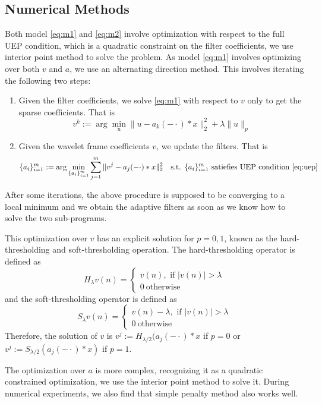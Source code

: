 \documentclass[a4paper]{article}
\begin{document}
\subsection{Numerical Methods}
Both model \eqref{eq:m1} and \eqref{eq:m2} involve optimization with respect to the full UEP condition, which is a quadratic constraint on the filter coefficients, we use interior point method to solve the problem. As model \eqref{eq:m1} involves optimizing over both $v$ and $a$, we use an alternating direction method. This involves iterating the following two steps:
\begin{enumerate}
	\item Given the filter coefficients, we solve \eqref{eq:m1} with respect to $v$ only to get the sparse coefficients. That is 
		\[
			v^{k} := \arg\min_u \|u-a_k(-\cdot)*x\|_2^2 + \lambda \|u\|_p
		\]
	\item Given the wavelet frame coefficients $v$, we update the filters. That is 
	\[
		\{a_i\}_{i=1}^m :=\arg\min_{\{a_i\}_{i=1}^{m}}  \sum_{j=1}^m \|v^j - a_j(-\cdot)*x\|_2^2 \quad \textrm{s.t. } \{a_i\}_{i=1}^m \textrm{ satiefies UEP condition \eqref{eq:uep}}
	\]
\end{enumerate}
After some iterations, the above procedure is supposed to be converging to a local minimum and we obtain the adaptive filters as soon as we know how to solve the two sub-programs. 

This optimization over $v$ has an explicit solution for $p=0,1$, known as the hard-thresholding and soft-thresholding operation.
The hard-thresholding operator is defined as 
\[
	H_\lambda v(n)=\left\{ \begin{array}{lr}  v(n), \textrm{ if } |v(n)| > \lambda \\0\ \textrm{otherwise}\end{array}\right .
\]
and the soft-thresholding operator is defined as
\[
	S_\lambda v(n)=\left\{ \begin{array}{lr}  v(n)-\lambda, \textrm{ if } |v(n)| > \lambda \\0\ \textrm{otherwise}\end{array}\right .
\]
Therefore, the solution of $v$ is $v^j:=H_{\lambda/2}(a_j(-\cdot)*x$ if $p=0$ or $v^j:=S_{\lambda/2}(a_j(-\cdot)*x)$ if $p=1$.

The optimization over $a$ is more complex, recognizing it as a quadratic constrained optimization, we use the interior point method to solve it. During numerical experiments, we also find that simple penalty method also works well.
\end{document}
